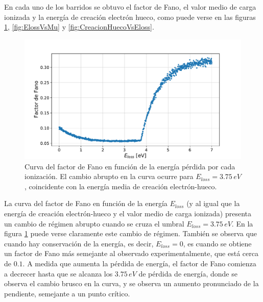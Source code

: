 En cada uno de los barridos se obtuvo el factor de Fano, el valor medio de carga ionizada y la energía de creación electrón hueco, como puede verse en las figuras \ref{fig:FanoVsEloss}, \ref{fig:ElossVsMu} y \ref{fig:CreacionHuecoVsEloss}.
\begin{figure}%
    \centering
    \includegraphics[scale=0.5]{Figs/Fano_vs_Eloss_5ktrials_0-7Eloss.pdf}
    \caption{\footnotesize{Curva del factor de Fano en función de la energía pérdida por cada ionización. El cambio abrupto en la curva ocurre para $E_{loss} = 3.75\,\si{eV}$, coincidente con la energía media de creación electrón-hueco.}}
    \label{fig:FanoVsEloss}
\end{figure}
La curva del factor de Fano en función de la energía $E_{loss}$ (y al igual que la energía de creación electrón-hueco y el valor medio de carga ionizada) presenta un cambio de régimen abrupto cuando se cruza el umbral $E_{loss} = 3.75\,\si{eV}$. En la figura \ref{fig:FanoVsEloss} puede verse claramente este cambio de régimen. También se observa que cuando hay conservación de la energía, es decir, $E_{loss} = 0$, es cuando se obtiene un factor de Fano más semejante al observado experimentalmente, que está cerca de $0.1$. A medida que aumenta la pérdida de energía, el factor de Fano comienza a decrecer hasta que se alcanza los $3.75\,\si{eV}$ de pérdida de energía, donde se observa el cambio brusco en la curva, y se observa un aumento pronunciado de la pendiente, semejante a un punto crítico.

